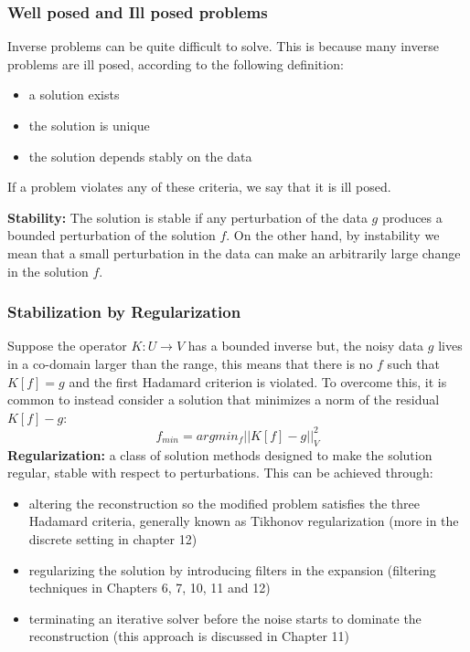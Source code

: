 \documentclass{article}
\begin{document}
\subsubsection{Well posed and Ill posed problems}
Inverse problems can be quite difficult to solve. This is because many inverse problems are ill posed, according to the following definition:

\begin{tcolorbox}[colback=seashell,colframe=beaublue,title= Hadamard’s criteria for a well-posed problem]
	\begin{itemize}
		\item a solution exists
		\item the solution is unique
		\item the solution depends stably on the data
	\end{itemize}
		If a problem violates any of these criteria, we say that it is ill posed.
\end{tcolorbox}
\textbf{Stability:}
\newline
The solution is stable if any perturbation of the data $g$ produces a bounded perturbation of the solution $f$.
\newline
On the other hand, by instability we mean that a small perturbation in the data can make an arbitrarily large change in the solution $f$.
\subsubsection{Stabilization by Regularization}
Suppose the operator $K : U \rightarrow V  $ has a bounded inverse but, the noisy data $g$ lives in a co-domain larger than the range, this means that there is no $f$ such that $ K[f] = g$ and the first Hadamard criterion is violated. 	 
 \newline	
		 \vspace{0.1cm}
\newline
	To overcome this, it is common to instead consider a solution that minimizes a norm of the residual $K[f] - g$: 
	$$ f_{min} = argmin_{f} || K[f] - g ||_{V}^{2} $$	  
	\vspace{0.1cm}
         \newline
	\textbf{Regularization:} a class of solution methods designed to make the solution regular, stable with respect to perturbations. This can be achieved through: 
	\begin{itemize}
		\item altering the reconstruction so the modified problem satisfies the three Hadamard criteria, generally known as Tikhonov regularization (more in the discrete setting in chapter 12)
		\item regularizing the solution by introducing filters in the expansion (filtering techniques in Chapters 6, 7, 10, 11 and 12)
		\item terminating an iterative solver before the noise starts to dominate the reconstruction (this approach is discussed in Chapter 11)
	\end{itemize}
\end{document}
